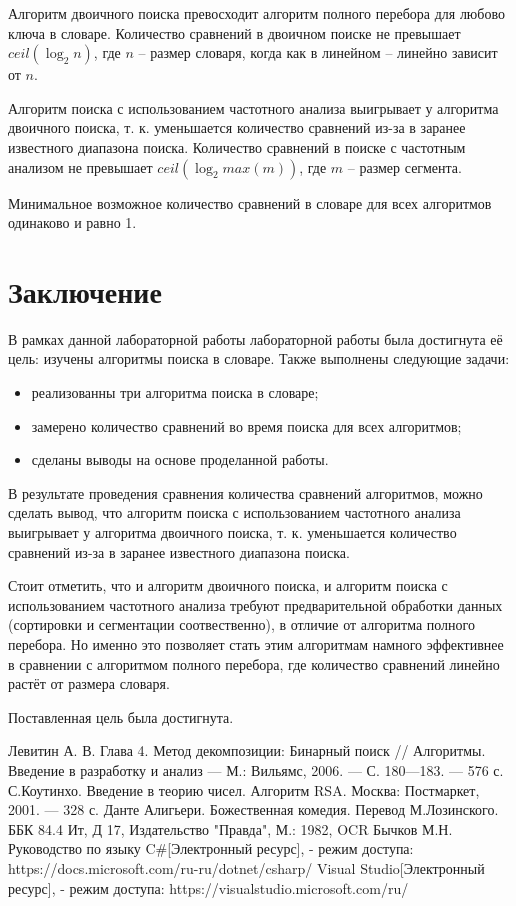 \documentclass[12pt]{report}
\begin{document}
Алгоритм двоичного поиска превосходит алгоритм полного перебора для любово ключа в словаре. Количество сравнений в двоичном поиске не превышает $ceil(\log_{2}{n})$, где $n$ -- размер словаря, когда как в линейном -- линейно зависит от $n$. 

Алгоритм поиска с использованием частотного анализа выигрывает у алгоритма двоичного поиска, т. к. уменьшается количество сравнений из-за в заранее известного диапазона поиска. Количество сравнений в поиске с частотным анализом не превышает $ceil(\log_{2}{max(m)})$, где $m$ -- размер сегмента.

Минимальное возможное количество сравнений в словаре для всех алгоритмов одинаково и равно 1.

\chapter*{Заключение}

В рамках данной лабораторной работы лабораторной работы была достигнута её цель: изучены алгоритмы поиска в словаре. Также выполнены следующие задачи:

\begin{itemize}
	\item реализованны три алгоритма поиска в словаре;
	\item замерено количество сравнений во время поиска для всех алгоритмов;
	\item сделаны выводы на основе проделанной работы.
\end{itemize}

В результате проведения сравнения количества сравнений алгоритмов, можно сделать вывод, что алгоритм поиска с использованием частотного анализа выигрывает у алгоритма двоичного поиска, т. к. уменьшается количество сравнений из-за в заранее известного диапазона поиска.

Стоит отметить, что и алгоритм двоичного поиска, и алгоритм поиска с использованием частотного анализа требуют предварительной обработки данных (сортировки и сегментации соотвественно), в отличие от алгоритма полного перебора. Но именно это позволяет стать этим алгоритмам намного эффективнее в сравнении с алгоритмом полного перебора, где количество сравнений линейно растёт от размера словаря.

Поставленная цель была достигнута.

\newpage
{}
\renewcommand\bibname{Список литературы}
\begin{thebibliography}{3}
	 Левитин А. В. Глава 4. Метод декомпозиции: Бинарный поиск // Алгоритмы. Введение в разработку и анализ — М.: Вильямс, 2006. — С. 180—183. — 576 с.
	 С.Коутинхо. Введение в теорию чисел. Алгоритм RSA. Москва: Постмаркет, 2001. — 328 с.
	 Данте Алигьери. Божественная комедия. Перевод М.Лозинского. ББК 84.4 Ит, Д 17, Издательство "Правда", М.: 1982, OCR Бычков М.Н.
	 Руководство по языку C\#[Электронный ресурс], - режим доступа: https://docs.microsoft.com/ru-ru/dotnet/csharp/
	 Visual Studio[Электронный ресурс], - режим доступа: https://visualstudio.microsoft.com/ru/
\end{thebibliography}
\end{document}
